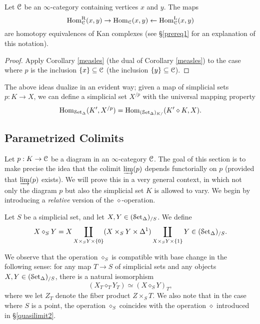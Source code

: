 \begin{corollary}\label{homsetsagree}
Let $\calC$ be an $\infty$-category containing vertices $x$ and $y$. The maps
$$ \Hom^{\rght}_{\calC}(x,y) \rightarrow \Hom_{\calC}(x,y) \leftarrow \Hom^{\lft}_{\calC}(x,y)$$
are homotopy equivalences of Kan complexes (see \S \ref{prereq1} for an explanation of this notation).
\end{corollary}

\begin{proof}
Apply Corollary \ref{measles} (the dual of Corollary \ref{measles}) to the case where $p$ is the
inclusion $\{x \} \subseteq \calC$ (the inclusion $\{y\} \subseteq \calC$).
\end{proof}

\begin{remark}
The above ideas dualize in an evident way; given a map of simplicial sets
$p: K \rightarrow X$, we can define a simplicial set $X^{/p}$ with the universal
mapping property
$$ \Hom_{\sSet}(K', X^{/p} ) = \Hom_{(\sSet)_{K/}}( K' \diamond K, X).$$
\end{remark}

\subsection{Parametrized Colimits}\label{consweet}

Let $p: K \rightarrow \calC$ be a diagram in an $\infty$-category $\calC$. The goal of this section is to make precise the idea that the colimit $\injlim(p)$ depends functorially on $p$ (provided that $\injlim(p)$ exists). We will prove this in a very general context, in which not only the diagram $p$ but also the simplicial set $K$ is allowed to vary. We begin by introducing a {\em relative} version of the $\diamond$-operation.

\begin{definition}
Let $S$ be a simplicial set, and let $X,Y \in (\sSet)_{/S}$. We define
$$X \diamond_S Y = X \coprod_{X \times_{S} Y \times \{0\} } (X \times_{S} Y \times \Delta^1) \coprod_{ X \times_{S} Y \times \{1\}} Y \in (\sSet)_{/S}.$$
\end{definition}

We observe that the operation $\diamond_S$ is compatible with base change in the following sense: for any map $T \rightarrow S$ of simplicial sets and any objects $X,Y \in (\sSet)_{/S}$, there is a natural isomorphism
$$ (X_T \diamond_T Y_T) \simeq (X \diamond_S Y)_T,$$
where we let $Z_T$ denote the fiber product $Z \times_{S} T$. 
We also note that in the case where $S$ is a point, the operation $\diamond_S$ coincides
with the operation $\diamond$ introduced in \S \ref{quasilimit2}. 

